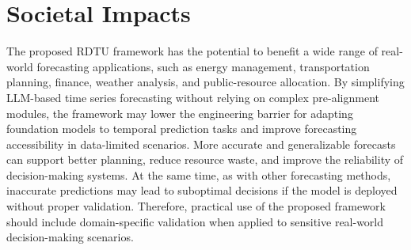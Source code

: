 \section{Societal Impacts}
The proposed RDTU framework has the potential to benefit a wide range of real-world forecasting applications, such as energy management, transportation planning, finance, weather analysis, and public-resource allocation. By simplifying LLM-based time series forecasting without relying on complex pre-alignment modules, the framework may lower the engineering barrier for adapting foundation models to temporal prediction tasks and improve forecasting accessibility in data-limited scenarios. More accurate and generalizable forecasts can support better planning, reduce resource waste, and improve the reliability of decision-making systems. At the same time, as with other forecasting methods, inaccurate predictions may lead to suboptimal decisions if the model is deployed without proper validation. Therefore, practical use of the proposed framework should include domain-specific validation when applied to sensitive real-world decision-making scenarios.
